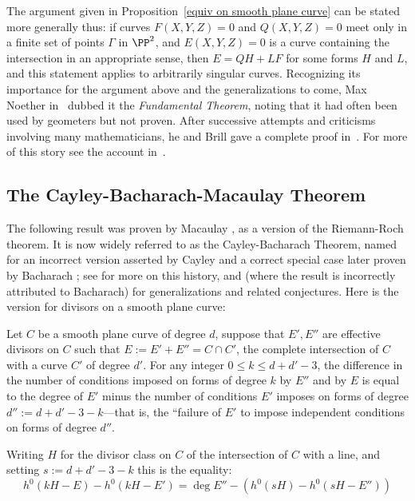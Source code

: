 The argument given in Proposition~\ref{equiv on smooth plane curve} can be stated more generally thus:  if curves $F(X,Y,Z)=0$ and $Q(X,Y,Z)=0$ 
meet only in a finite set of points $\Gamma$ in $\PP^{2}$, and $E(X,Y,Z) = 0$ is a curve containing the intersection in an appropriate sense,
then $E = QH +LF$ for some forms $H$ and $L$, and this statement applies to arbitrarily singular curves. Recognizing its importance for the argument above and the generalizations to come, Max Noether in~\cite{Noether1873} dubbed it the \emph{Fundamental Theorem}, 
noting that it had often been used by geometers but not proven. After successive attempts and 
criticisms involving many mathematicians, he and Brill gave a complete proof in~\cite{Brill-Noether}. For more of this story see the account in~\cite{eisenbud-gray}.

\subsection{The Cayley-Bacharach-Macaulay Theorem}\label{CB section}

The following result was proven by Macaulay \cite[p.~424]{Macaulay1900}, as a version of the Riemann-Roch theorem. It is now widely referred to as the Cayley-Bacharach Theorem, named for an
incorrect version asserted by Cayley and a correct special case later proven by 
Bacharach\cite{Bacharach1886}
; see \cite[Section 2.3]{Threads} for more on this history, and 
\cite{MR1376653} (where the result is incorrectly attributed to Bacharach) for generalizations and related conjectures. Here is the version for divisors on a smooth plane curve:

\begin{theorem}\label{CBM} Let $C$ be a smooth plane curve of degree $d$, suppose that
$E', E''$ are effective divisors on $C$ such that $E:=E'+E'' = C\cap C'$, the complete intersection of $C$
with a curve $C'$ of degree $d'$. For any integer $0\leq k \leq d+d'-3$, the difference in the number of conditions imposed 
on forms of degree $k$ by $E''$ and by $E$ is equal to the degree of $E'$ minus the
number of conditions $E'$ imposes on forms of degree $d'':=d+d'-3 -k$---that is, the ``failure of
$E'$ to impose independent conditions on forms of degree $d''$.

 Writing $H$ for
the divisor class on $C$ of the intersection of $C$ with a line, and setting $s := d+d'-3-k$ this is the equality:
$$
h^0(kH-E) - h^0(kH-E')  = \deg E'' - \left(h^0(sH) -  h^0(sH-E'')\right)
$$
\end{theorem}

